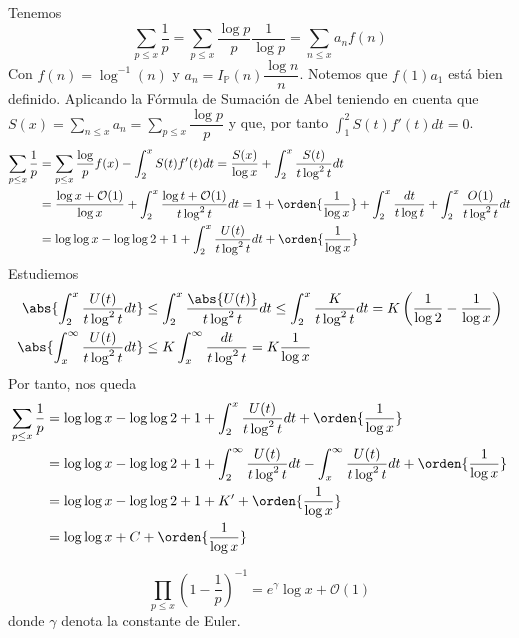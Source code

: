 \documentclass[TAN.tex]{subfiles}
\begin{document}
\begin{dem}
Tenemos
$$
\sum_{p≤x} \frac{1}{p} = \sum_{p≤x} \frac{\log p}{p}\frac{1}{\log p} = \sum_{n≤x} a_n f(n)
$$
Con $f(n)=\log^{-1}(n)$ y $a_n = I_{\mathbb{P}}(n)\dfrac{\log n}{n}$. Notemos que $f(1)a_1$ está bien definido. Aplicando la Fórmula de Sumación de Abel teniendo en cuenta que $S(x)=\sum_{n\leq x}a_n = \sum_{p\leq x}\dfrac{\log p}{p}$ y que, por tanto $\int_1^2S(t)f'(t)dt = 0$.
\begin{align*}
\sum_{p\leq x}\frac{1}{p}&= \sum_{p\leq x}\dfrac{\log}{p}f(x)-\int_2^x S(t)f'(t)dt = \frac{S(x)}{\log x} +\int_2^x \frac{S(t)}{t\log^2t}dt \\
&=\frac{\log x + \mathcal{O}(1)}{\log x} +\int_2^x \frac{\log t + \mathcal{O}(1)}{t\log^2t}dt = 1 + \orden{\frac{1}{\log x}}+\int_2^x\frac{dt}{t\log t}+\int_2^x\frac{O(1)}{t\log^2 t}dt\\
&=\log\log x - \log\log 2 +1 + \int_2^x\frac{U(t)}{t\log^2 t}dt+ \orden{\frac{1}{\log x}}
\end{align*}
Estudiemos 
\begin{align*}
\abs{\int_2^x\frac{U(t)}{t\log^2 t}dt}&\leq \int_2^x\frac{\abs{U(t)}}{t\log^2 t}dt \leq \int_2^x\frac{K}{t\log^2 t}dt = K\left(\frac{1}{\log 2}-\frac{1}{\log x} \right)\\
\abs{\int_x^\infty \frac{U(t)}{t\log^2 t}dt}&\leq K\int_x^{\infty}\frac{dt}{t\log^2t} = K\frac{1}{\log x}
\end{align*}
Por tanto, nos queda
\begin{align*}
\sum_{p\leq x}\frac{1}{p} &=  \log\log x - \log\log 2 +1 + \int_2^x\frac{U(t)}{t\log^2 t}dt+ \orden{\frac{1}{\log x}}\\
&=\log\log x - \log\log 2 +1 + \int_2^\infty\frac{U(t)}{t\log^2 t}dt- \int_x^\infty\frac{U(t)}{t\log^2 t}dt+\orden{\frac{1}{\log x}}\\
&=\log\log x - \log\log 2 +1 + K' + \orden{\frac{1}{\log x}}\\
&=\log\log x +C+ \orden{\frac{1}{\log x}}
\end{align*}
\end{dem}
\begin{teorema}
\[ \prod_{p≤x} \left(1-\frac{1}{p}\right)^{-1} = e^γ\log x + \mathcal{O}(1) \]
donde $γ$ denota la constante de Euler.
\end{teorema}
\end{document}
